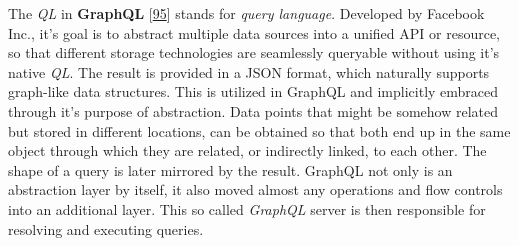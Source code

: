 \documentclass[12pt,english,a4paper,titlepage,cleardoublepage=empty,dottedtoc]{report}
\begin{document}
The \emph{QL} in \textbf{\protect\hypertarget{link-graphql}{}{GraphQL}}
{[}\protect\hyperlink{ref-web_spec_graphql}{95}{]} stands for
\emph{query language}. Developed by Facebook Inc., it's goal is to
abstract multiple data sources into a unified API or resource, so that
different storage technologies are seamlessly queryable without using
it's native \emph{QL}. The result is provided in a JSON format, which
naturally supports graph-like data structures. This is utilized in
GraphQL and implicitly embraced through it's purpose of abstraction.
Data points that might be somehow related but stored in different
locations, can be obtained so that both end up in the same object
through which they are related, or indirectly linked, to each other. The
shape of a query is later mirrored by the result. GraphQL not only is an
abstraction layer by itself, it also moved almost any operations and
flow controls into an additional layer. This so called \emph{GraphQL}
server is then responsible for resolving and executing queries.
\end{document}
